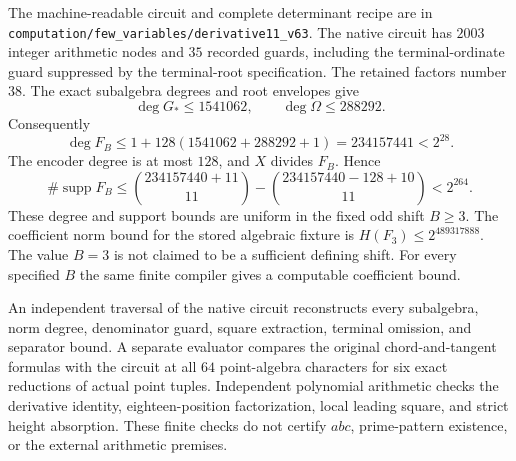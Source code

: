 \documentclass[11pt,a4paper]{article}
\begin{document}
The machine-readable circuit and complete determinant recipe are in
\nolinkurl{computation/few_variables/derivative11_v63}.
The native circuit has $2003$ integer arithmetic nodes and $35$
recorded guards, including the terminal-ordinate guard suppressed by
the terminal-root specification. The retained factors number $38$.
The exact subalgebra degrees and root envelopes give
\[
 \deg G_*\le1541062,\qquad \deg\Omega\le288292.
\]
Consequently
\[
 \deg F_B\le1+128(1541062+288292+1)
                         =234157441<2^{28}.
\]
The encoder degree is at most $128$, and $X$ divides $F_B$. Hence
\[
 \#\operatorname{supp}F_B
 \le\binom{234157440+11}{11}
       -\binom{234157440-128+10}{11}<2^{264}.
\]
These degree and support bounds are uniform in the fixed odd shift
$B\ge3$. The coefficient norm bound for the stored algebraic fixture
is $H(F_3)\le2^{489317888}$. The value $B=3$ is not claimed to be a
sufficient defining shift. For every specified $B$ the same finite
compiler gives a computable coefficient bound.

An independent traversal of the native circuit reconstructs every
subalgebra, norm degree, denominator guard, square extraction,
terminal omission, and separator bound. A separate evaluator compares
the original chord-and-tangent formulas with the circuit at all $64$
point-algebra characters for six exact reductions of actual point
tuples. Independent polynomial arithmetic checks the derivative
identity, eighteen-position factorization, local leading square,
and strict height absorption. These finite checks do not certify
$abc$, prime-pattern existence, or the external arithmetic premises.
\end{document}
